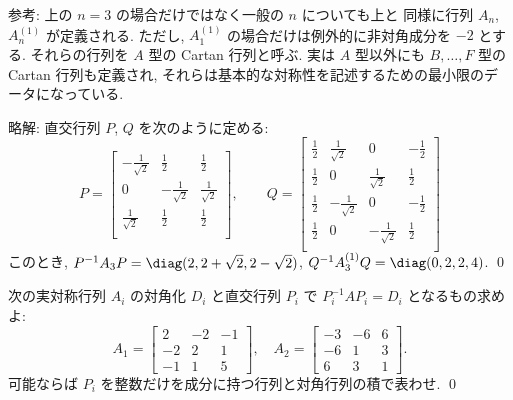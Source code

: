 \documentclass[12pt,twoside]{jarticle}
\newcommand\commentout[1]{#1}
\newcommand\commentout[1]{}
\begin{document}
\noindent
参考: 上の $n=3$ の場合だけではなく一般の $n$ についても上と
同様に行列 $A_n$, $A_n^{(1)}$ が定義される.
ただし, $A_1^{(1)}$ の場合だけは例外的に非対角成分を $-2$ とする.
それらの行列を $A$ 型の Cartan 行列と呼ぶ.
実は $A$ 型以外にも $B,\dots,F$ 型の Cartan 行列も定義され, 
それらは基本的な対称性を記述するための最小限のデータになっている.

\commentout{
\medskip
\noindent
略解: 直交行列 $P$, $Q$ を次のように定める:
\begin{equation*}
  P =
  \begin{bmatrix}
    -\frac{1}{\sqrt{2}} &  \frac{1}{2}        & \frac{1}{2} \\
             0          & -\frac{1}{\sqrt{2}} & \frac{1}{\sqrt{2}} \\
     \frac{1}{\sqrt{2}} &  \frac{1}{2}        & \frac{1}{2} \\
  \end{bmatrix},
  \qquad
  Q =
  \begin{bmatrix}
    \frac{1}{2} &  \frac{1}{\sqrt{2}} &         0           & -\frac{1}{2} \\
    \frac{1}{2} &         0           &  \frac{1}{\sqrt{2}} &  \frac{1}{2} \\
    \frac{1}{2} & -\frac{1}{\sqrt{2}} &         0           & -\frac{1}{2} \\
    \frac{1}{2} &         0           & -\frac{1}{\sqrt{2}} &  \frac{1}{2} \\
  \end{bmatrix}
\end{equation*}
このとき, $P^{-1}A_3 P = \diag(2, 2+\sqrt{2}, 2-\sqrt{2})$,
$Q^{-1}A_3^{(1)}Q = \diag(0,2,2,4)$. \qed
}


\begin{question}
\label{q:ars-1}
  次の実対称行列 $A_i$ の対角化 $D_i$ と直交行列 $P_i$ で $P_i^{-1}AP_i=D_i$ 
  となるもの求めよ:
  \begin{equation*}
    A_1 =
    \left[ 
      \begin{array}{rrr}
        2 & -2 & -1 \\
        -2 & 2 & 1 \\
        -1 & 1 & 5
      \end{array}
    \right],
    \quad
    A_2 =
    \left[ 
      \begin{array}{rrr}
        -3 & -6 & 6 \\
        -6 & 1 & 3 \\
        6 & 3 & 1
      \end{array}
    \right].
  \end{equation*}
  可能ならば $P_i$ を整数だけを成分に持つ行列と対角行列の積で表わせ.
  \qed
\end{question}
\end{document}
